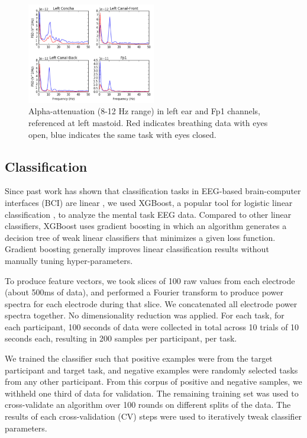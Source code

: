 \documentclass[a4paper,twoside]{article}
\begin{document}
\begin{figure}[h]
\centering
\includegraphics[width=0.5\textwidth]{figures/002_AlphaAtt_all.jpg}
\caption{Alpha-attenuation (8-12 Hz range) in left ear and Fp1 channels, referenced at left mastoid. Red indicates breathing data with eyes open, blue indicates the same task with eyes closed.}
\label{fig:alpha_atten}
\end{figure}

\subsection{Classification}

\noindent Since past work has shown that classification tasks in EEG-based brain-computer interfaces (BCI) are linear \cite{Garrett2003a}, we used XGBoost, a popular tool for logistic linear classification \cite{Chen2016}, to analyze the mental task EEG data. Compared to other linear classifiers, XGBoost uses gradient boosting in which an algorithm generates a decision tree of weak linear classifiers that minimizes a given loss function. Gradient boosting generally improves linear classification results without manually tuning hyper-parameters.

To produce feature vectors, we took slices of 100 raw values from each electrode (about 500ms of data), and performed a Fourier transform to produce power spectra for each electrode during that slice. We concatenated all electrode power spectra together. No dimensionality reduction was applied. For each task, for each participant, 100 seconds of data were collected in total across 10 trials of 10 seconds each, resulting in 200 samples per participant, per task.

We trained the classifier such that positive examples were from the target participant and target task, and negative examples were randomly selected tasks from any other participant. From this corpus of positive and negative samples, we withheld one third of data for validation. The remaining training set was used to cross-validate an algorithm over 100 rounds on different splits of the data. The results of each cross-validation (CV) steps were used to iteratively tweak classifier parameters. 
\end{document}
